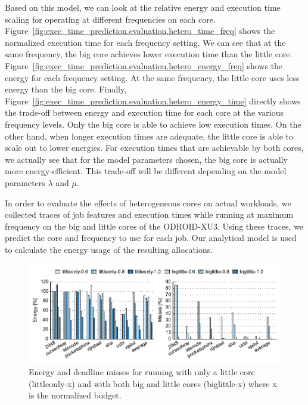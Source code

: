 Based on this model, we can look at the relative energy and execution time
scaling for operating at different frequencies on each core.
Figure~\ref{fig:exec_time_prediction.evaluation.hetero_time_freq} shows the
normalized execution time for each frequency setting. We can see that at the
same frequency, the big core achieves lower execution time than the little
core. Figure~\ref{fig:exec_time_prediction.evaluation.hetero_energy_freq} shows
the energy for each frequency setting. At the same frequency, the little core
uses less energy than the big core. Finally,
Figure~\ref{fig:exec_time_prediction.evaluation.hetero_energy_time} directly
shows the trade-off between energy and execution time for each core at the
various frequency levels. Only the big core is able to achieve low execution
times. On the other hand, when longer execution times are adequate, the little
core is able to scale out to lower energies. For execution times that are
achievable by both cores, we actually see that for the model parameters chosen,
the big core is actually more energy-efficient. This trade-off will be
different depending on the model parameters $\lambda$ and $\mu$.

In order to evaluate the effects of heterogeneous cores on actual workloads, we
collected traces of job features and execution times while running at maximum
frequency on the big and little cores of the ODROID-XU3. Using these traces, we
predict the core and frequency to use for each job. Our analytical model is
used to calculate the energy usage of the resulting allocations.

\begin{figure}
  \begin{center}
    \includegraphics{exec_time_prediction/data/hetero_little_em.pdf}
    \caption{Energy and deadline misses for running with only a little core
    (littleonly-x) and with both big and little cores (biglittle-x) where x is
    the normalized budget.}
    \label{fig:exec_time_prediction.evaluation.hetero_little_em}
  \end{center}
\end{figure}

